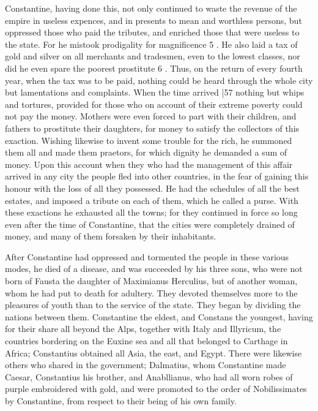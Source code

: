Constantine, having done this, not only continued to waste the revenue of the empire in useless expences, and in presents to mean and worthless persons, but oppressed those who paid the tributes, and enriched those that were useless to the state. For he mistook prodigality for
magnificence 5 . He also laid a tax of gold and silver on all merchants and tradesmen, even to the lowest classes, nor did he even spare the poorest prostitute
6 . Thus, on the return of every fourth year, when the tax was to be paid, nothing could be heard through the whole city but lamentations and complaints. When the time arrived
|57 nothing but whips and tortures, provided for those who on account of their extreme poverty could not pay the money. Mothers were even forced to part with their children, and fathers to prostitute their daughters, for money to satisfy the collectors of this exaction. Wishing likewise to invent some trouble for the
rich, he summoned them all and made them praetors, for which dignity he demanded a sum of money. Upon this account when they who had the management of this affair arrived in any city the people fled into other countries, in the fear of gaining this honour with the loss of all they possessed. He had the schedules of all the best estates, and imposed a tribute on each of them,
which he called a purse. With these exactions he exhausted all the towns; for they continued in force so long even after the time of Constantine, that the cities were completely drained of money, and many of them forsaken by their inhabitants.

After Constantine had oppressed and tormented the people in these various modes, he died of a disease, and was succeeded by his three sons, who were not born of Fausta the daughter of Maximianus Herculius, but of another woman, whom he had put to death for adultery. They devoted themselves more to the pleasures of youth than to the service of the state. They began by dividing the nations between them. Constantine the eldest, and Constans the youngest, having for their share all beyond the Alps, together with Italy and Illyricum, the countries bordering on the Euxine sea and all that belonged to Carthage in Africa; Constantius obtained all Asia, the east, and Egypt. There were likewise others who shared in the government; Dalmatius, whom Constantine made Caesar, Constantius his brother, and Anabllianus, who had all worn robes of purple embroidered with gold, and were promoted to the order of Nobilissimates by Constantine, from respect to their being of his own family.

